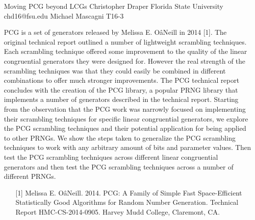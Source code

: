 \begin{talk}
  {Moving PCG beyond LCGs}%
  {Christopher Draper}%
  {Florida State University}%
  {chd16@fsu.edu}%
  { Michael Mascagni}%
  {T16-3}%
			
PCG is a set of generators released by Melissa E. OâNeill in 2014 [1]. The original technical report outlined a number of lightweight
scrambling techniques. Each scrambling technique offered some improvement to the quality of the linear congruential generators
they were designed for. However the real strength of the scrambling techniques was that they could easily be combined in different
combinations to offer much stronger improvements. The PCG technical report concludes with the creation of the PCG library, a
popular PRNG library that implements a number of generators described in the technical report. Starting from the observation that the
PCG work was narrowly focused on implementing their scrambling techniques for specific linear congruential generators, we explore
the PCG scrambling techniques and their potential application for being applied to other PRNGs. We show the steps taken to generalize the PCG
scrambling techniques to work with any arbitrary amount of bits and parameter values. Then test the PCG scrambling techniques
across different linear congruential generators and then test the PCG scrambling techniques across a number of different PRNGs.
\medskip

\begin{enumerate}
	\item[{[1]}] Melissa E. OâNeill. 2014. PCG: A Family of Simple Fast Space-Efficient Statistically Good Algorithms for Random Number Generation. Technical Report HMC-CS-2014-0905. Harvey Mudd College, Claremont, CA.
\end{enumerate}

\end{talk}

